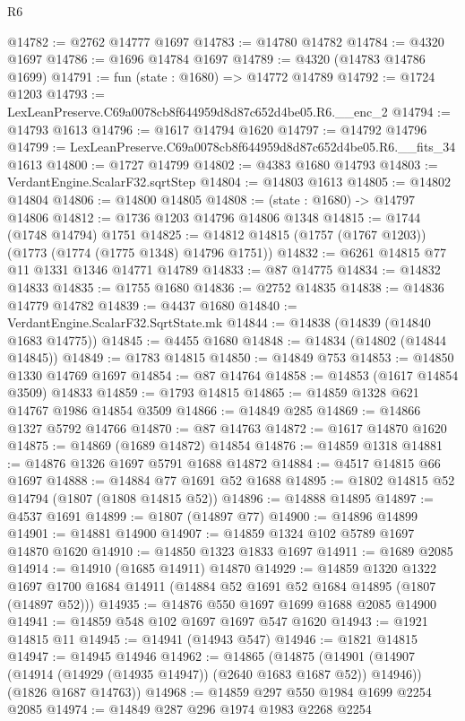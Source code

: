 \begin{lexlean}{R6}
\begin{coremodule}
@14782 := @2762 @14777 @1697
@14783 := @14780 @14782
@14784 := @4320 @1697
@14786 := @1696 @14784 @1697
@14789 := @4320 (@14783 @14786 @1699)
@14791 := fun (state : @1680) => @14772 @14789
@14792 := @1724 @1203
@14793 := LexLeanPreserve.C69a0078cb8f644959d8d87c652d4be05.R6.__enc_2
@14794 := @14793 @1613
@14796 := @1617 @14794 @1620
@14797 := @14792 @14796
@14799 := LexLeanPreserve.C69a0078cb8f644959d8d87c652d4be05.R6.__fits_34 @1613
@14800 := @1727 @14799
@14802 := @4383 @1680 @14793
@14803 := VerdantEngine.ScalarF32.sqrtStep
@14804 := @14803 @1613
@14805 := @14802 @14804
@14806 := @14800 @14805
@14808 := (state : @1680) -> @14797 @14806
@14812 := @1736 @1203 @14796 @14806 @1348
@14815 := @1744 (@1748 @14794) @1751
@14825 := @14812 @14815 (@1757 (@1767 @1203)) (@1773 (@1774 (@1775 @1348) @14796 @1751))
@14832 := @6261 @14815 @77 @11 @1331 @1346 @14771 @14789
@14833 := @87 @14775
@14834 := @14832 @14833
@14835 := @1755 @1680
@14836 := @2752 @14835
@14838 := @14836 @14779 @14782
@14839 := @4437 @1680
@14840 := VerdantEngine.ScalarF32.SqrtState.mk
@14844 := @14838 (@14839 (@14840 @1683 @14775))
@14845 := @4455 @1680
@14848 := @14834 (@14802 (@14844 @14845))
@14849 := @1783 @14815
@14850 := @14849 @753
@14853 := @14850 @1330 @14769 @1697
@14854 := @87 @14764
@14858 := @14853 (@1617 @14854 @3509) @14833
@14859 := @1793 @14815
@14865 := @14859 @1328 @621 @14767 @1986 @14854 @3509
@14866 := @14849 @285
@14869 := @14866 @1327 @5792 @14766
@14870 := @87 @14763
@14872 := @1617 @14870 @1620
@14875 := @14869 (@1689 @14872) @14854
@14876 := @14859 @1318
@14881 := @14876 @1326 @1697 @5791 @1688 @14872
@14884 := @4517 @14815 @66 @1697
@14888 := @14884 @77 @1691 @52 @1688
@14895 := @1802 @14815 @52 @14794 (@1807 (@1808 @14815 @52))
@14896 := @14888 @14895
@14897 := @4537 @1691
@14899 := @1807 (@14897 @77)
@14900 := @14896 @14899
@14901 := @14881 @14900
@14907 := @14859 @1324 @102 @5789 @1697 @14870 @1620
@14910 := @14850 @1323 @1833 @1697
@14911 := @1689 @2085
@14914 := @14910 (@1685 @14911) @14870
@14929 := @14859
    @1320
    @1322
    @1697
    @1700
    @1684
    @14911
    (@14884 @52 @1691 @52 @1684 @14895 (@1807 (@14897 @52)))
@14935 := @14876 @550 @1697 @1699 @1688 @2085 @14900
@14941 := @14859 @548 @102 @1697 @1697 @547 @1620
@14943 := @1921 @14815 @11
@14945 := @14941 (@14943 @547)
@14946 := @1821 @14815
@14947 := @14945 @14946
@14962 := @14865
    (@14875
      (@14901 (@14907 (@14914 (@14929 (@14935 @14947)) (@2640 @1683 @1687 @52)) @14946))
      (@1826 @1687 @14763))
@14968 := @14859 @297 @550 @1984 @1699 @2254 @2085
@14974 := @14849 @287 @296 @1974 @1983 @2268 @2254

\end{coremodule}
\end{lexlean}
